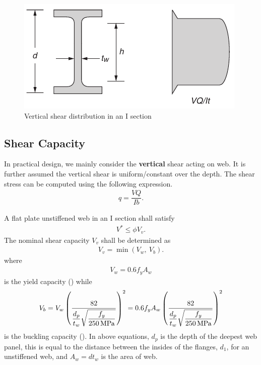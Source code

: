\begin{figure}[H]
\centering\footnotesize
\includegraphics{PIC/CH05/VSHEAR}
\caption{Vertical shear distribution in an I section}\label{fig:vshear}
\end{figure}
\subsection{Shear Capacity}
In practical design, we mainly consider the \textbf{vertical} shear acting on web. It is further assumed the vertical shear is uniform/constant over the depth. The shear stress can be computed using the following expression.
\begin{gather*}
q=\dfrac{VQ}{Ib}.
\end{gather*}

A flat plate unstiffened web in an I section shall satisfy
\begin{gather}
V^*\leqslant\phi{}V_v.
\end{gather}
The nominal shear capacity $V_v$ shall be determined as
\begin{gather}
V_v=\min\left(V_w,~V_b\right).
\end{gather}
where
\begin{gather}
V_w=0.6f_yA_w
\end{gather}
is the yield capacity () while
\begin{gather}
V_b=V_w\left(\dfrac{82}{\dfrac{d_p}{t_w}\sqrt{\dfrac{f_y}{\SI{250}{\mega\pascal}}}}\right)^2=0.6f_yA_w\left(\dfrac{82}{\dfrac{d_p}{t_w}\sqrt{\dfrac{f_y}{\SI{250}{\mega\pascal}}}}\right)^2
\end{gather}
is the buckling capacity (). In above equations, $d_p$ is the depth of the deepest web panel, this is equal to the distance between the insides of the flanges, $d_1$, for an unstiffened web, and $A_w=dt_w$ is the area of web.

